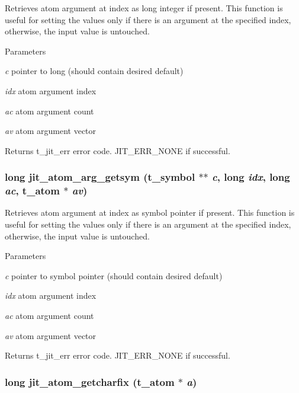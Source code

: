 Retrieves atom argument at index as long integer if present. This function is useful for setting the values only if there is an argument at the specified index, otherwise, the input value is untouched.


\begin{DoxyParams}{Parameters}
\item[{\em c}]pointer to long (should contain desired default) \item[{\em idx}]atom argument index \item[{\em ac}]atom argument count \item[{\em av}]atom argument vector\end{DoxyParams}
\begin{DoxyReturn}{Returns}
t\_\-jit\_\-err error code. JIT\_\-ERR\_\-NONE if successful. 
\end{DoxyReturn}
\hypertarget{group__atommod_ga6be2fbebadc03614cd5e621da17ff289}{
\subsubsection[{jit\_\-atom\_\-arg\_\-getsym}]{\setlength{\rightskip}{0pt plus 5cm}long jit\_\-atom\_\-arg\_\-getsym ({\bf t\_\-symbol} $\ast$$\ast$ {\em c}, \/  long {\em idx}, \/  long {\em ac}, \/  {\bf t\_\-atom} $\ast$ {\em av})}}
\label{group__atommod_ga6be2fbebadc03614cd5e621da17ff289}


Retrieves atom argument at index as symbol pointer if present. This function is useful for setting the values only if there is an argument at the specified index, otherwise, the input value is untouched.


\begin{DoxyParams}{Parameters}
\item[{\em c}]pointer to symbol pointer (should contain desired default) \item[{\em idx}]atom argument index \item[{\em ac}]atom argument count \item[{\em av}]atom argument vector\end{DoxyParams}
\begin{DoxyReturn}{Returns}
t\_\-jit\_\-err error code. JIT\_\-ERR\_\-NONE if successful. 
\end{DoxyReturn}
\hypertarget{group__atommod_ga52eb4a47524e12d8999cd8606a0d2e31}{
\subsubsection[{jit\_\-atom\_\-getcharfix}]{\setlength{\rightskip}{0pt plus 5cm}long jit\_\-atom\_\-getcharfix ({\bf t\_\-atom} $\ast$ {\em a})}}
\label{group__atommod_ga52eb4a47524e12d8999cd8606a0d2e31}


